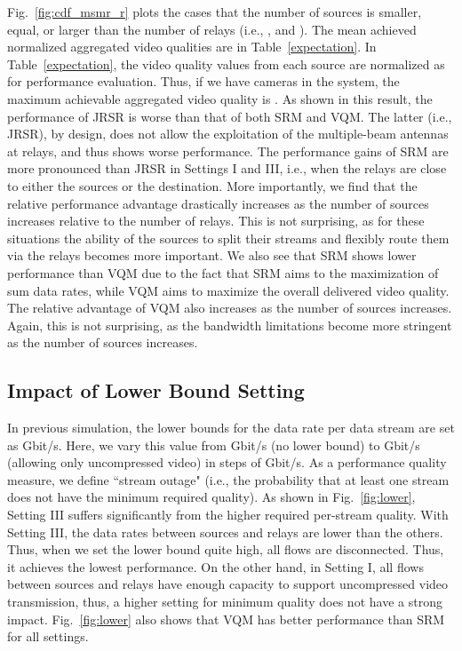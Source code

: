 \documentclass[conference]{IEEEtran}
\begin{document}
Fig.~\ref{fig:cdf_msmr_r} plots the cases that the number of sources is smaller, equal, or larger than the number of relays (i.e., , and ).
The mean achieved normalized aggregated video qualities are in Table~\ref{expectation}.
In Table~\ref{expectation}, the video quality values from each source are normalized as  for performance evaluation.
Thus, if we have  cameras in the system, the maximum achievable aggregated video quality is .
As shown in this result, the performance of \textsf{JRSR} is worse than that of both \textsf{SRM} and \textsf{VQM}.
The latter (i.e., \textsf{JRSR}), by design, does not allow the exploitation of the multiple-beam antennas at relays, and thus shows worse performance.
The performance gains of \textsf{SRM} are more pronounced than \textsf{JRSR} in Settings I and III, i.e., when the relays are close to either the sources or the destination. More importantly, we find that the relative performance advantage drastically increases as the number of sources increases relative to the number of relays. This is not surprising, as for these situations the ability of the sources to split their streams and flexibly route them via the relays becomes more important.
We also see that \textsf{SRM} shows lower performance than \textsf{VQM} due to the fact that \textsf{SRM} aims to the maximization of sum data rates, while \textsf{VQM} aims to maximize the overall delivered video quality.
The relative advantage of \textsf{VQM} also increases as the number of sources increases. Again, this is not surprising, as the bandwidth limitations become more stringent as the number of sources increases.



\subsection{Impact of Lower Bound Setting}\label{sec:sim04}
In previous simulation, the lower bounds for the data rate per data stream are set as  Gbit/s. Here, we vary this value from  Gbit/s (no lower bound) to  Gbit/s (allowing only uncompressed video) in steps of  Gbit/s. As a performance quality measure, we define ``stream outage" (i.e., the probability that at least one stream does not have the minimum required quality).
As shown in Fig.~\ref{fig:lower}, Setting III suffers significantly from the higher required per-stream quality.
With Setting III, the data rates between sources and relays are lower than the others.
Thus, when we set the lower bound quite high, all flows are disconnected. Thus, it achieves the lowest performance.
On the other hand, in Setting I, all flows between sources and relays have enough capacity to support uncompressed video transmission, thus, a higher setting for minimum quality does not have a strong impact.
Fig.~\ref{fig:lower} also shows that \textsf{VQM} has better performance than \textsf{SRM} for all settings.
\end{document}
